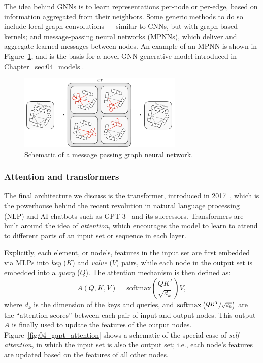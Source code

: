 The idea behind GNNs is to learn representations per-node or per-edge, based on information aggregated from their neighbors.
Some generic methods to do so include local graph convolutions --- similar to CNNs, but with graph-based kernels; and message-passing neural networks (MPNNs), which deliver and aggregate learned messages between nodes.
An example of an MPNN is shown in Figure~\ref{fig:03_ml_gnn}, and is the basis for a novel GNN generative model introduced in Chapter~\ref{sec:04_models}.

\begin{figure}[ht]
    \centering
    \captionsetup{justification=centering}
    \includegraphics[width=0.7\textwidth]{figures/06-ML4Jets/equivariantnns/mpnn_box_line.pdf}
    \caption{Schematic of a message passing graph neural network.}
    \label{fig:03_ml_gnn}
\end{figure}


\subsubsection{Attention and transformers}

The final architecture we discuss is the transformer, introduced in 2017~\cite{vaswani2017attention}, which is the powerhouse behind the recent revolution in natural language processing (NLP) and AI chatbots such as GPT-3~\cite{brown2020language} and its successors.
Transformers are built around the idea of \textit{attention}, which encourages the model to learn to attend to different parts of an input set or sequence in each layer.

Explicitly, each element, or node's, features in the input set are first embedded via MLPs into \textit{key} ($K$) and \textit{value} ($V$) pairs, while each node in the output set is embedded into a \textit{query} ($Q$).
The attention mechanism is then defined as:
\begin{equation}
    \label{eq:03_ml_attention}
    A(Q, K, V) = \mathrm{softmax}\left(\frac{QK^T}{\sqrt{d_k}}\right)V,
\end{equation}
where $d_k$ is the dimension of the keys and queries, and $\mathrm{softmax}\left(\nicefrac{QK^T}{\sqrt{d_k}}\right)$ are the ``attention scores'' between each pair of input and output nodes.
This output $A$ is finally used to update the features of the output nodes.
Figure~\ref{fig:04_gapt_attention} shows a schematic of the special case of \textit{self-attention}, in which the input set is also the output set; i.e., each node's features are updated based on the features of all other nodes.

